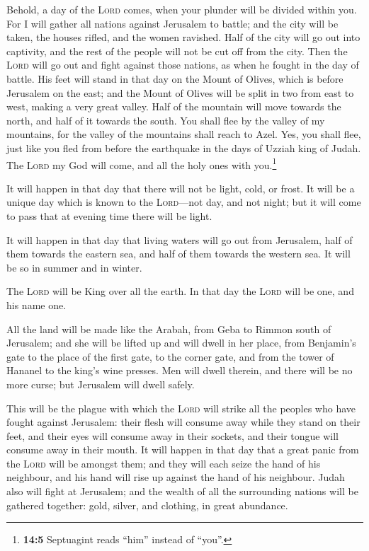  Behold, a day of the \textsc{Lord} comes, when your
plunder will be divided within you.  For I will gather all
nations against Jerusalem to battle; and the city will be taken, the
houses rifled, and the women ravished. Half of the city will go out into
captivity, and the rest of the people will not be cut off from the city.
 Then the \textsc{Lord} will go out and fight against
those nations, as when he fought in the day of battle. 
His feet will stand in that day on the Mount of Olives, which is before
Jerusalem on the east; and the Mount of Olives will be split in two from
east to west, making a very great valley. Half of the mountain will move
towards the north, and half of it towards the south.  You
shall flee by the valley of my mountains, for the valley of the
mountains shall reach to Azel. Yes, you shall flee, just like you fled
from before the earthquake in the days of Uzziah king of Judah. The
\textsc{Lord} my God will come, and all the holy ones with
you.\footnote{\textbf{14:5} Septuagint reads ``him'' instead of ``you''.}

 It will happen in that day that there will not be light,
cold, or frost.  It will be a unique day which is known to
the \textsc{Lord}---not day, and not night; but it will come to pass
that at evening time there will be light.

 It will happen in that day that living waters will go out
from Jerusalem, half of them towards the eastern sea, and half of them
towards the western sea. It will be so in summer and in winter.

 The \textsc{Lord} will be King over all the earth. In
that day the \textsc{Lord} will be one, and his name one.

 All the land will be made like the Arabah, from Geba to
Rimmon south of Jerusalem; and she will be lifted up and will dwell in
her place, from Benjamin's gate to the place of the first gate, to the
corner gate, and from the tower of Hananel to the king's wine presses.
 Men will dwell therein, and there will be no more curse;
but Jerusalem will dwell safely.

 This will be the plague with which the \textsc{Lord}
will strike all the peoples who have fought against Jerusalem: their
flesh will consume away while they stand on their feet, and their eyes
will consume away in their sockets, and their tongue will consume away
in their mouth.  It will happen in that day that a great
panic from the \textsc{Lord} will be amongst them; and they will each
seize the hand of his neighbour, and his hand will rise up against the
hand of his neighbour.  Judah also will fight at
Jerusalem; and the wealth of all the surrounding nations will be
gathered together: gold, silver, and clothing, in great abundance.

